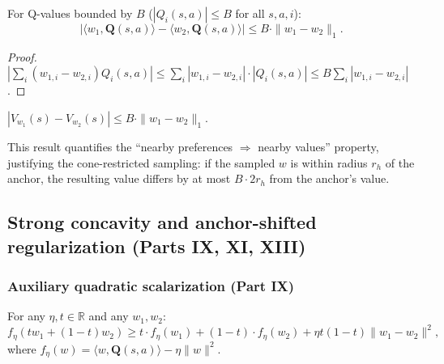 \begin{lemma}
\label{lem:weight_lipschitz}
For Q-values bounded by $B$ ($|Q_i(s,a)| \le B$ for all $s,a,i$):
\begin{equation}
    |\langle w_1, \mathbf{Q}(s,a) \rangle - \langle w_2, \mathbf{Q}(s,a) \rangle| \le B \cdot \|w_1 - w_2\|_1.
\end{equation}
\end{lemma}

\begin{proof}
$|\sum_i (w_{1,i} - w_{2,i}) Q_i(s,a)| \le \sum_i |w_{1,i} - w_{2,i}| \cdot |Q_i(s,a)| \le B \sum_i |w_{1,i} - w_{2,i}|$.
\end{proof}

\begin{corollary}
$|V_{w_1}(s) - V_{w_2}(s)| \le B \cdot \|w_1 - w_2\|_1$.
\end{corollary}

This result quantifies the ``nearby preferences $\Rightarrow$ nearby values'' property, justifying the cone-restricted sampling: if the sampled $w$ is within radius $r_h$ of the anchor, the resulting value differs by at most $B \cdot 2r_h$ from the anchor's value.


\subsection{Strong concavity and anchor-shifted regularization (Parts IX, XI, XIII)}
\label{sec:anchor}

\subsubsection{Auxiliary quadratic scalarization (Part IX)}

\begin{theorem}
\label{thm:strong_concavity}
For any $\eta, t \in \mathbb{R}$ and any $w_1, w_2$:
\begin{equation}
    f_\eta(tw_1 + (1{-}t)w_2) \ge t \cdot f_\eta(w_1) + (1{-}t) \cdot f_\eta(w_2) + \eta t(1{-}t)\|w_1 - w_2\|^2,
\end{equation}
where $f_\eta(w) = \langle w, \mathbf{Q}(s,a) \rangle - \eta\|w\|^2$.
\end{theorem}

